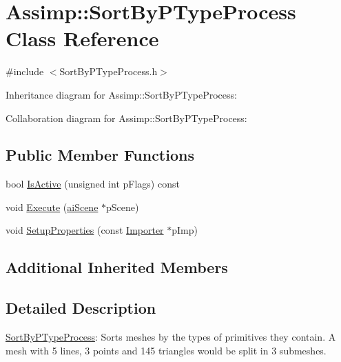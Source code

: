 \hypertarget{class_assimp_1_1_sort_by_p_type_process}{\section{Assimp\+:\+:Sort\+By\+P\+Type\+Process Class Reference}
\label{class_assimp_1_1_sort_by_p_type_process}
}


{\ttfamily \#include $<$Sort\+By\+P\+Type\+Process.\+h$>$}



Inheritance diagram for Assimp\+:\+:Sort\+By\+P\+Type\+Process\+:


Collaboration diagram for Assimp\+:\+:Sort\+By\+P\+Type\+Process\+:
\subsection*{Public Member Functions}
\begin{DoxyCompactItemize}
\item 
bool \hyperlink{class_assimp_1_1_sort_by_p_type_process_a4a6a252e094ea33c5701ea94708bd1da}{Is\+Active} (unsigned int p\+Flags) const 
\item 
void \hyperlink{class_assimp_1_1_sort_by_p_type_process_a2b86b16593ebe43a41f76707c992a4e0}{Execute} (\hyperlink{structai_scene}{ai\+Scene} $\ast$p\+Scene)
\item 
void \hyperlink{class_assimp_1_1_sort_by_p_type_process_ac09e30908353a5f38d2592320b4f779c}{Setup\+Properties} (const \hyperlink{class_assimp_1_1_importer}{Importer} $\ast$p\+Imp)
\end{DoxyCompactItemize}
\subsection*{Additional Inherited Members}


\subsection{Detailed Description}
\hyperlink{class_assimp_1_1_sort_by_p_type_process}{Sort\+By\+P\+Type\+Process}\+: Sorts meshes by the types of primitives they contain. A mesh with 5 lines, 3 points and 145 triangles would be split in 3 submeshes. 

